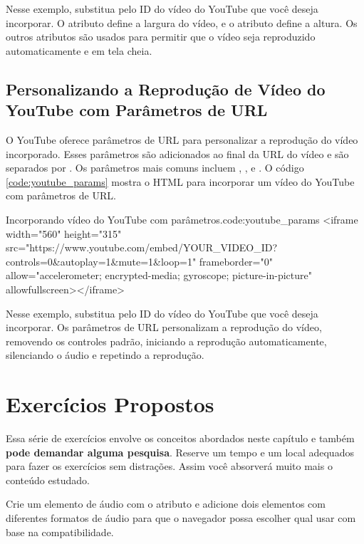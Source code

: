 Nesse exemplo, substitua  pelo ID do vídeo do YouTube que você deseja incorporar. O atributo  define a largura do vídeo, e o atributo  define a altura. Os outros atributos são usados para permitir que o vídeo seja reproduzido automaticamente e em tela cheia.

\subsection{Personalizando a Reprodução de Vídeo do YouTube com Parâmetros de URL}

O YouTube oferece parâmetros de URL para personalizar a reprodução do vídeo incorporado. Esses parâmetros são adicionados ao final da URL do vídeo e são separados por \var{\&}. Os parâmetros mais comuns incluem , ,  e . O código \ref{code:youtube_params} mostra o HTML para incorporar um vídeo do YouTube com parâmetros de URL.

\begin{htmlcode}{Incorporando vídeo do YouTube com parâmetros.}{code:youtube_params}
<iframe width="560" height="315" src="https://www.youtube.com/embed/YOUR_VIDEO_ID?
  controls=0&autoplay=1&mute=1&loop=1" frameborder="0" allow="accelerometer; 
  encrypted-media; gyroscope; picture-in-picture" allowfullscreen></iframe>
\end{htmlcode}

Nesse exemplo, substitua  pelo ID do vídeo do YouTube que você deseja incorporar. Os parâmetros de URL personalizam a reprodução do vídeo, removendo os controles padrão, iniciando a reprodução automaticamente, silenciando o áudio e repetindo a reprodução.

\section{Exercícios Propostos}

Essa série de exercícios envolve os conceitos abordados neste capítulo e também \textbf{pode demandar alguma pesquisa}. Reserve um tempo e um local adequados para fazer os exercícios sem distrações. Assim você absorverá muito mais o conteúdo estudado.

\begin{exercise}
Crie um elemento de áudio com o atributo  e adicione dois elementos  com diferentes formatos de áudio para que o navegador possa escolher qual usar com base na compatibilidade.
\end{exercise}

